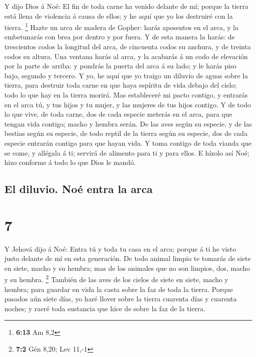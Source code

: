  Y dijo Dios á Noé: El fin de toda carne ha venido
delante de mí; porque la tierra está llena de violencia á causa de
ellos; y he aquí que yo los destruiré con la tierra. \footnote{\textbf{6:13}
  Am 8,2}  Hazte un arca de madera de Gopher: harás
aposentos en el arca, y la embetunarás con brea por dentro y por fuera.
 Y de esta manera la harás: de trescientos codos la
longitud del arca, de cincuenta codos su anchura, y de treinta codos su
altura.  Una ventana harás al arca, y la acabarás á un
codo de elevación por la parte de arriba: y pondrás la puerta del arca á
su lado; y le harás piso bajo, segundo y tercero.  Y yo,
he aquí que yo traigo un diluvio de aguas sobre la tierra, para destruir
toda carne en que haya espíritu de vida debajo del cielo; todo lo que
hay en la tierra morirá.  Mas estableceré mi pacto
contigo, y entrarás en el arca tú, y tus hijos y tu mujer, y las mujeres
de tus hijos contigo.  Y de todo lo que vive, de toda
carne, dos de cada especie meterás en el arca, para que tengan vida
contigo; macho y hembra serán.  De las aves según su
especie, y de las bestias según su especie, de todo reptil de la tierra
según su especie, dos de cada especie entrarán contigo para que hayan
vida.  Y toma contigo de toda vianda que se come, y
allégala á ti; servirá de alimento para ti y para ellos. 
E hízolo así Noé; hizo conforme á todo lo que Dios le mandó.

\hypertarget{el-diluvio.-nouxe9-entra-la-arca}{%
\subsection{El diluvio. Noé entra la
arca}\label{el-diluvio.-nouxe9-entra-la-arca}}

\hypertarget{section-6}{%
\section{7}\label{section-6}}

 Y Jehová dijo á Noé: Entra tú y toda tu casa en el arca;
porque á ti he visto justo delante de mí en esta generación.
 De todo animal limpio te tomarás de siete en siete, macho
y su hembra; mas de los animales que no son limpios, dos, macho y su
hembra. \footnote{\textbf{7:2} Gén 8,20; Lev 11,-1} 
También de las aves de los cielos de siete en siete, macho y hembra;
para guardar en vida la casta sobre la faz de toda la tierra.
 Porque pasados aún siete días, yo haré llover sobre la
tierra cuarenta días y cuarenta noches; y raeré toda sustancia que hice
de sobre la faz de la tierra.

